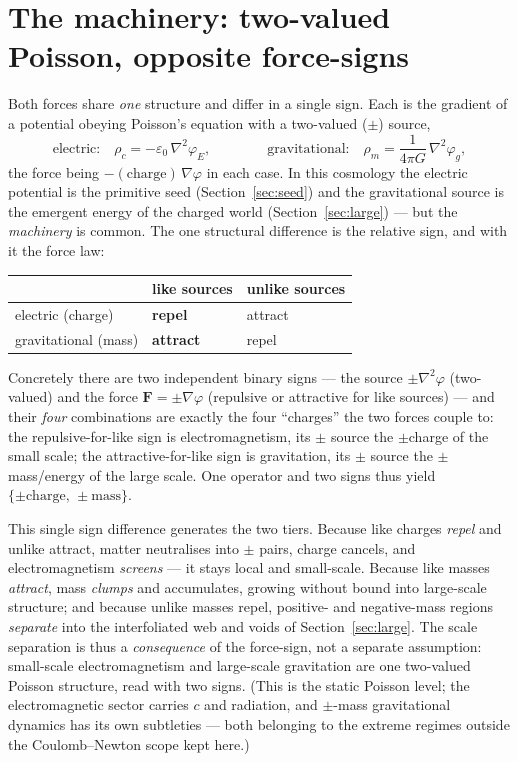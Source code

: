 \documentclass[11pt]{article}
\newcommand{\grad}{\nabla}
\begin{document}
\section{The machinery: two-valued Poisson, opposite force-signs}\label{sec:machinery}
Both forces share \emph{one} structure and differ in a single sign. Each is the gradient of a potential obeying
Poisson's equation with a two-valued ($\pm$) source,
\begin{equation}
\text{electric:}\quad \rho_c=-\varepsilon_0\,\grad^2\varphi_E,
\qquad\qquad
\text{gravitational:}\quad \rho_m=\frac{1}{4\pi G}\,\grad^2\varphi_g,
\end{equation}
the force being $-(\text{charge})\,\grad\varphi$ in each case. In this cosmology the electric potential is the
primitive seed (Section~\ref{sec:seed}) and the gravitational source is the emergent energy of the charged world
(Section~\ref{sec:large}) --- but the \emph{machinery} is common. The one structural difference is the relative
sign, and with it the force law:
\begin{center}
\begin{tabular}{lll}
\toprule
 & like sources & unlike sources \\
\midrule
electric (charge) & \textbf{repel} & attract \\
gravitational (mass) & \textbf{attract} & repel \\
\bottomrule
\end{tabular}
\end{center}
Concretely there are two independent binary signs --- the source $\pm\grad^2\varphi$ (two-valued) and the force
$\mathbf F=\pm\grad\varphi$ (repulsive or attractive for like sources) --- and their \emph{four} combinations are
exactly the four ``charges'' the two forces couple to: the repulsive-for-like sign is electromagnetism, its $\pm$
source the $\pm$charge of the small scale; the attractive-for-like sign is gravitation, its $\pm$ source the $\pm$
mass/energy of the large scale. One operator and two signs thus yield $\{\pm\text{charge},\,\pm\text{mass}\}$.

This single sign difference generates the two tiers. Because like charges \emph{repel} and unlike attract, matter
neutralises into $\pm$ pairs, charge cancels, and electromagnetism \emph{screens} --- it stays local and
small-scale. Because like masses \emph{attract}, mass \emph{clumps} and accumulates, growing without bound into
large-scale structure; and because unlike masses repel, positive- and negative-mass regions \emph{separate} into
the interfoliated web and voids of Section~\ref{sec:large}. The scale separation is thus a \emph{consequence} of
the force-sign, not a separate assumption: small-scale electromagnetism and large-scale gravitation are one
two-valued Poisson structure, read with two signs. (This is the static Poisson level; the electromagnetic sector
carries $c$ and radiation, and $\pm$-mass gravitational dynamics has its own subtleties --- both belonging to the
extreme regimes outside the Coulomb--Newton scope kept here.)
\end{document}
